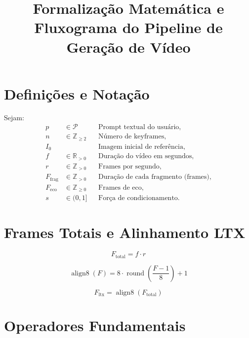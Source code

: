 \documentclass[12pt,a4paper]{article}
\title{Formalização Matemática e Fluxograma do Pipeline de Geração de Vídeo}
\author{}
\date{}
\begin{document}
\maketitle

\section{Definições e Notação}

Sejam:
\begin{align}
p &\in \mathcal{P} & &\text{Prompt textual do usuário},\\
n &\in \mathbb{Z}_{\ge 2} & &\text{Número de keyframes},\\
I_0 & & &\text{Imagem inicial de referência},\\
f &\in \mathbb{R}_{>0} & &\text{Duração do vídeo em segundos},\\
r &\in \mathbb{Z}_{>0} & &\text{Frames por segundo},\\
F_{\mathrm{frag}} &\in \mathbb{Z}_{>0} & &\text{Duração de cada fragmento (frames)},\\
F_{\mathrm{eco}} &\in \mathbb{Z}_{\ge 0} & &\text{Frames de eco},\\
s &\in (0,1] & &\text{Força de condicionamento}.
\end{align}

\section{Frames Totais e Alinhamento LTX}

\begin{equation}
F_{\mathrm{total}} = f \cdot r
\end{equation}

\begin{equation}
\operatorname{align8}(F) = 8 \cdot \operatorname{round}\!\left(\frac{F-1}{8}\right) + 1
\end{equation}

\begin{equation}
F_{\mathrm{ltx}} = \operatorname{align8}\left(F_{\mathrm{total}}\right)
\end{equation}

\section{Operadores Fundamentais}
\end{document}
